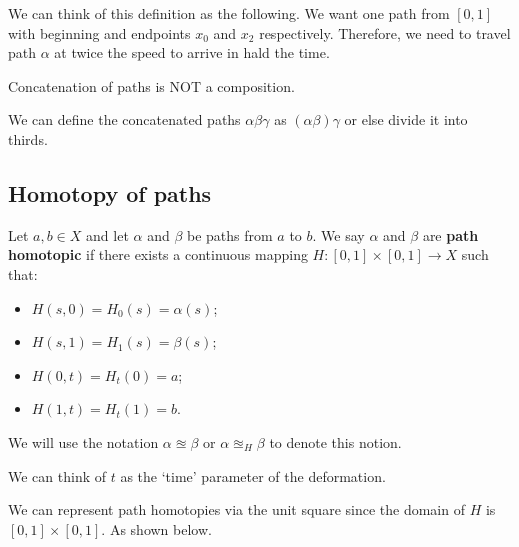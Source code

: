 \documentclass[12pt, a4paper]{article}
\begin{document}
\begin{mdnote}
    We can think of this definition as the following. We want one path from \([0,1]\) with beginning and endpoints \(x_0\) and \(x_2\) respectively. Therefore, we need to travel path \(\alpha\) at twice the speed to arrive in hald the time. 
\end{mdnote}

\begin{mdremark}
    Concatenation of paths is NOT a composition.
\end{mdremark}

\begin{mdremark}
    We can define the concatenated paths \(\alpha\beta\gamma\)     as \((\alpha\beta)\gamma\) or else divide it into thirds.
\end{mdremark}

\subsection{Homotopy of paths}

\begin{definition}
    Let \(a,b \in X\) and let \(\alpha\) and \(\beta\) be paths from \(a\) to \(b\). We say \(\alpha\) and \(\beta\) are \textbf{path homotopic} if there exists a continuous mapping \(H : [0,1] \times [0,1] \to X\) such that: 
    \begin{itemize}
        \item \(H(s,0)=H_0(s) =\alpha(s)\);
        \item \(H(s,1)=H_1(s)=\beta(s)\);
        \item \(H(0,t)=H_t(0)=a\);
        \item \(H(1,t)=H_t(1)=b\).
    \end{itemize}
    We will use the notation \(\alpha \approxeq \beta\) or \(\alpha \approxeq_H \beta\) to denote this notion.
\end{definition}

\begin{mdnote}
    We can think of \(t\) as the `time' parameter of the deformation.
\end{mdnote}

We can represent path homotopies via the unit square since the domain of \(H\) is \([0,1]\times[0,1]\). As shown below.
\end{document}
